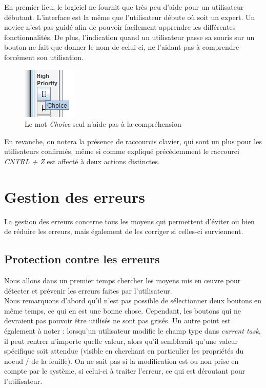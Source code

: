 \documentclass[12pt, a4paper]{article}
\begin{document}
En premier lieu, le logiciel ne fournit que très peu d'aide pour un utilisateur débutant. L'interface est la même que l'utilisateur débute où soit un expert. Un novice n'est pas guidé afin de pouvoir facilement apprendre les différentes fonctionnalités. De plus, l'indication quand un utilisateur passe sa souris sur un bouton ne fait que donner le nom de celui-ci, ne l'aidant pas à comprendre forcément son utilisation.
\begin{figure}[h]
\begin{center}
   \includegraphics[scale = 1]{imagebtn.jpg}
	\caption{Le mot \emph{Choice} seul n'aide pas à la compréhension}
	\end{center}
\end{figure}

En revanche, on notera la présence de raccourcis clavier, qui sont un plus pour les utilisateurs confirmés, même si comme expliqué précédemment le raccourci \emph{CNTRL + Z} est affecté à deux actions distinctes.

\section{Gestion des erreurs}
La gestion des erreurs concerne tous les moyens qui permettent d'éviter ou bien de réduire les erreurs, mais également de les corriger si celles-ci surviennent.

\subsection{Protection contre les erreurs}
Nous allons dans un premier temps chercher les moyens mis en œuvre pour détecter et prévenir les erreurs faites par l'utilisateur. \\


Nous remarquons d'abord qu'il n'est pas possible de sélectionner deux boutons en même temps, ce qui en est une bonne chose. Cependant, les boutons qui ne devraient pas pouvoir être utilisés ne sont pas grisés. Un autre point est également à noter : lorsqu'un utilisateur modifie le champ type dans \emph{current task}, il peut rentrer n'importe quelle valeur, alors qu'il semblerait qu'une valeur spécifique soit attendue (visible en cherchant en particulier les propriétés du noeud / de la feuille). On ne sait pas si la modification est ou non prise en compte par le système, si celui-ci à traiter l'erreur, ce qui est déroutant pour l'utilisateur.
\newpage
\end{document}
